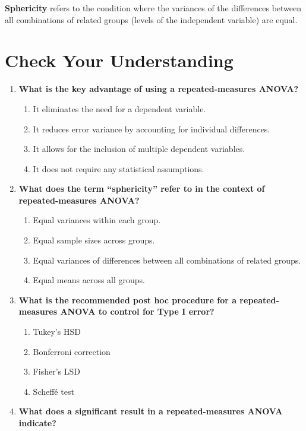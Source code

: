 \documentclass[
  letterpaper,
  DIV=11,
  numbers=noendperiod]{scrreprt}
\begin{document}
\textbf{Sphericity} refers to the condition where the variances of the
differences between all combinations of related groups (levels of the
independent variable) are equal.

\section*{Check Your Understanding}\label{check-your-understanding-12}


\begin{enumerate}
\def\labelenumi{\arabic{enumi}.}
\item
  \textbf{What is the key advantage of using a repeated-measures ANOVA?}

  \begin{enumerate}
  \def\labelenumii{\alph{enumii}.}
  \item
    It eliminates the need for a dependent variable.
  \item
    It reduces error variance by accounting for individual differences.
  \item
    It allows for the inclusion of multiple dependent variables.
  \item
    It does not require any statistical assumptions.
  \end{enumerate}
\item
  \textbf{What does the term ``sphericity'' refer to in the context of
  repeated-measures ANOVA?}

  \begin{enumerate}
  \def\labelenumii{\alph{enumii}.}
  \item
    Equal variances within each group.
  \item
    Equal sample sizes across groups.
  \item
    Equal variances of differences between all combinations of related
    groups.
  \item
    Equal means across all groups.
  \end{enumerate}
\item
  \textbf{What is the recommended post hoc procedure for a
  repeated-measures ANOVA to control for Type I error?}

  \begin{enumerate}
  \def\labelenumii{\alph{enumii}.}
  \item
    Tukey's HSD
  \item
    Bonferroni correction
  \item
    Fisher's LSD
  \item
    Scheffé test
  \end{enumerate}
\item
  \textbf{What does a significant result in a repeated-measures ANOVA
  indicate?}


\end{enumerate}
\end{document}
